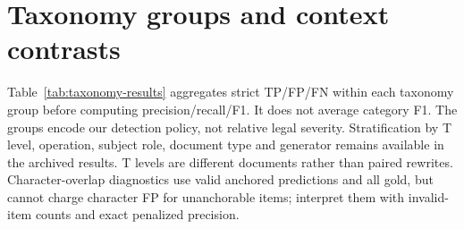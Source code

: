 \section{Taxonomy groups and context contrasts}
\label{app:result-layout}

Table~\ref{tab:taxonomy-results} aggregates strict TP/FP/FN within each taxonomy group before computing precision/recall/F1. It does not average category F1. The groups encode our detection policy, not relative legal severity. Stratification by T level, operation, subject role, document type and generator remains available in the archived results. T levels are different documents rather than paired rewrites. Character-overlap diagnostics use valid anchored predictions and all gold, but cannot charge character FP for unanchorable items; interpret them with invalid-item counts and exact penalized precision.

